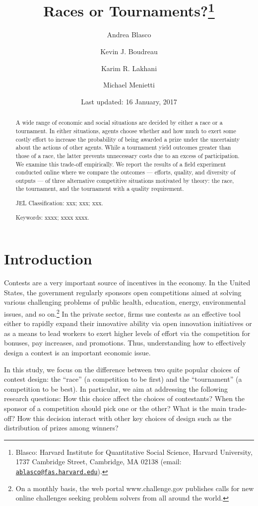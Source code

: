 \documentclass[12pt,]{article}
\title{Races or Tournaments?\thanks{Blasco: Harvard Institute for Quantitative Social Science, Harvard
University, 1737 Cambridge Street, Cambridge, MA 02138 (email:
\href{mailto:ablasco@fas.harvard.edu}{\nolinkurl{ablasco@fas.harvard.edu}}).}}
\author{Andrea Blasco \and Kevin J. Boudreau \and Karim R. Lakhani \and Michael Menietti}
\date{Last updated: 16 January, 2017}
\begin{document}
\maketitle
\begin{abstract}
A wide range of economic and social situations are decided by either a
race or a tournament. In either situations, agents choose whether and
how much to exert some costly effort to increase the probability of
being awarded a prize under the uncertainty about the actions of other
agents. While a tournament yield outcomes greater than those of a race,
the latter prevents unnecessary costs due to an excess of participation.
We examine this trade-off empirically. We report the results of a field
experiment conducted online where we compare the outcomes --- efforts,
quality, and diversity of outputs --- of three alternative competitive
situations motivated by theory: the race, the tournament, and the
tournament with a quality requirement.

\smallskip\noindent 
JEL Classification: xxx; xxx; xxx.

\smallskip\noindent 
Keywords: xxxx; xxxx xxxx.
\end{abstract}


\clearpage
\tableofcontents
\setcounter{tocdepth}{2}
\clearpage

\section{Introduction}\label{introduction}

Contests are a very important source of incentives in the economy. In
the United States, the government regularly sponsors open competitions
aimed at solving various challenging problems of public health,
education, energy, environmental issues, and so on.\footnote{On a
  monthly basis, the web portal www.challenge.gov publishes calls for
  new online challenges seeking problem solvers from all around the
  world.} In the private sector, firms use contests as an effective tool
either to rapidly expand their innovative ability via open innovation
initiatives or as a means to lead workers to exert higher levels of
effort via the competition for bonuses, pay increases, and promotions.
Thus, understanding how to effectively design a contest is an important
economic issue.

In this study, we focus on the difference between two quite popular
choices of contest design: the ``race'' (a competition to be first) and
the ``tournament'' (a competition to be best). In particular, we aim at
addressing the following research questions: How this choice affect the
choices of contestants? When the sponsor of a competition should pick
one or the other? What is the main trade-off? How this decision interact
with other key choices of design such as the distribution of prizes
among winners?
\end{document}
